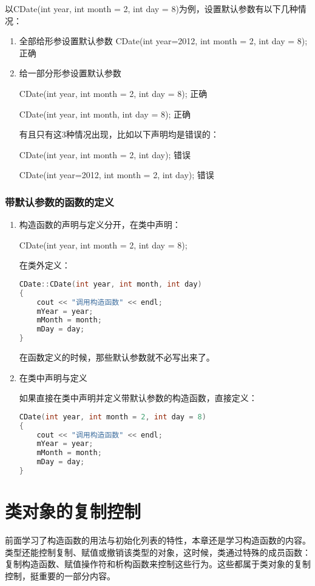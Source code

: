 \documentclass{article}
\begin{document}
以CDate(int year, int month = 2, int day = 8)为例，设置默认参数有以下几种情况：

\begin{enumerate}
\item 全部给形参设置默认参数
\label{sec-4-2-1-1}
CDate(int year=2012, int month = 2, int day = 8);   正确
\item 给一部分形参设置默认参数
\label{sec-4-2-1-2}

CDate(int year, int month = 2, int day = 8);   正确

CDate(int year, int month, int day = 8);   正确

有且只有这3种情况出现，比如以下声明均是错误的：

CDate(int year, int month = 2, int day);   错误

CDate(int year=2012, int month = 2, int day);   错误
\end{enumerate}
\subsubsection{带默认参数的函数的定义}
\label{sec-4-2-2}
\begin{enumerate}
\item 构造函数的声明与定义分开，在类中声明：
\label{sec-4-2-2-1}

CDate(int year, int month = 2, int day = 8);

在类外定义：

\begin{lstlisting}[language=c++]
CDate::CDate(int year, int month, int day)  
{  
    cout << "调用构造函数" << endl;  
    mYear = year;  
    mMonth = month;  
    mDay = day;  
}  
\end{lstlisting}
在函数定义的时候，那些默认参数就不必写出来了。
\item 在类中声明与定义
\label{sec-4-2-2-2}

如果直接在类中声明并定义带默认参数的构造函数，直接定义：
\begin{lstlisting}[language=c++]
CDate(int year, int month = 2, int day = 8)  
{  
    cout << "调用构造函数" << endl;  
    mYear = year;  
    mMonth = month;  
    mDay = day;  
}  
\end{lstlisting}
\end{enumerate}

\section{类对象的复制控制}
\label{sec-5}
前面学习了构造函数的用法与初始化列表的特性，本章还是学习构造函数的内容。类型还能控制复制、赋值或撤销该类型的对象，这时候，类通过特殊的成员函数：复制构造函数、赋值操作符和析构函数来控制这些行为。这些都属于类对象的复制控制，挺重要的一部分内容。
\end{document}
